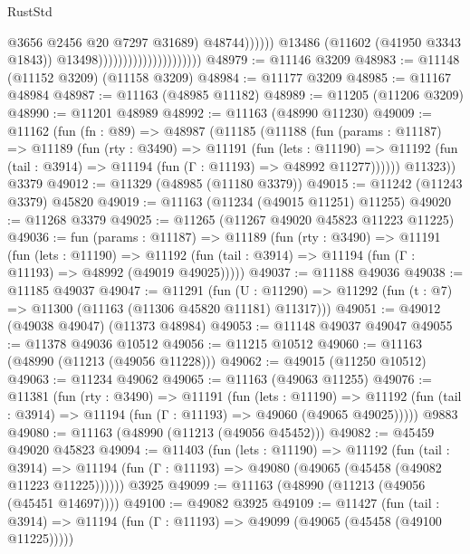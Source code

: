 \begin{lexlean}{RustStd}
\begin{coremodule}
                                                            @3656
                                                            @2456
                                                            @20
                                                            @7297
                                                            @31689)
                                                          @48744))))))
                                              @13486
                                              (@11602 (@41950 @3343 @1843))
                                              @13498)))))))))))))))))))))
@48979 := @11146 @3209
@48983 := @11148 (@11152 @3209) (@11158 @3209)
@48984 := @11177 @3209
@48985 := @11167 @48984
@48987 := @11163 (@48985 @11182)
@48989 := @11205 (@11206 @3209)
@48990 := @11201 @48989
@48992 := @11163 (@48990 @11230)
@49009 := @11162
    (fun (fn : @89) =>
    @48987
      (@11185
        (@11188
          (fun (params : @11187) =>
          @11189
            (fun (rty : @3490) =>
            @11191
              (fun (lets : @11190) =>
              @11192 (fun (tail : @3914) => @11194 (fun (Γ : @11193) => @48992 @11277))))))
        @11323))
    @3379
@49012 := @11329 (@48985 (@11180 @3379))
@49015 := @11242 (@11243 @3379) @45820
@49019 := @11163 (@11234 (@49015 @11251) @11255)
@49020 := @11268 @3379
@49025 := @11265 (@11267 @49020 @45823 @11223 @11225)
@49036 := fun (params : @11187) =>
  @11189
    (fun (rty : @3490) =>
    @11191
      (fun (lets : @11190) =>
      @11192 (fun (tail : @3914) => @11194 (fun (Γ : @11193) => @48992 (@49019 @49025)))))
@49037 := @11188 @49036
@49038 := @11185 @49037
@49047 := @11291
    (fun (U : @11290) => @11292 (fun (t : @7) => @11300 (@11163 (@11306 @45820 @11181) @11317)))
@49051 := @49012 (@49038 @49047) (@11373 @48984)
@49053 := @11148 @49037 @49047
@49055 := @11378 @49036 @10512
@49056 := @11215 @10512
@49060 := @11163 (@48990 (@11213 (@49056 @11228)))
@49062 := @49015 (@11250 @10512)
@49063 := @11234 @49062
@49065 := @11163 (@49063 @11255)
@49076 := @11381
    (fun (rty : @3490) =>
    @11191
      (fun (lets : @11190) =>
      @11192 (fun (tail : @3914) => @11194 (fun (Γ : @11193) => @49060 (@49065 @49025)))))
    @9883
@49080 := @11163 (@48990 (@11213 (@49056 @45452)))
@49082 := @45459 @49020 @45823
@49094 := @11403
    (fun (lets : @11190) =>
    @11192
      (fun (tail : @3914) =>
      @11194 (fun (Γ : @11193) => @49080 (@49065 (@45458 (@49082 @11223 @11225))))))
    @3925
@49099 := @11163 (@48990 (@11213 (@49056 (@45451 @14697))))
@49100 := @49082 @3925
@49109 := @11427
    (fun (tail : @3914) => @11194 (fun (Γ : @11193) => @49099 (@49065 (@45458 (@49100 @11225)))))

\end{coremodule}
\end{lexlean}
